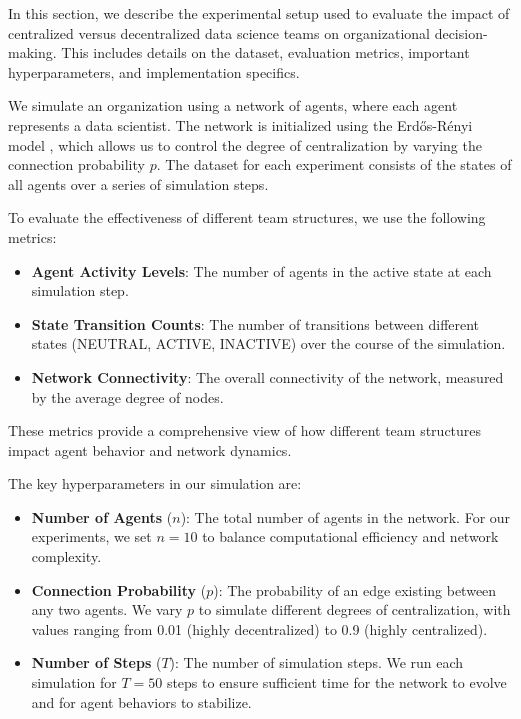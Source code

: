 \documentclass{article} %
\begin{document}
In this section, we describe the experimental setup used to evaluate the impact of centralized versus decentralized data science teams on organizational decision-making. This includes details on the dataset, evaluation metrics, important hyperparameters, and implementation specifics.

We simulate an organization using a network of agents, where each agent represents a data scientist. The network is initialized using the Erdős-Rényi model \citep{erdos1960evolution}, which allows us to control the degree of centralization by varying the connection probability \( p \). The dataset for each experiment consists of the states of all agents over a series of simulation steps.

To evaluate the effectiveness of different team structures, we use the following metrics:
\begin{itemize}
    \item \textbf{Agent Activity Levels}: The number of agents in the active state at each simulation step.
    \item \textbf{State Transition Counts}: The number of transitions between different states (NEUTRAL, ACTIVE, INACTIVE) over the course of the simulation.
    \item \textbf{Network Connectivity}: The overall connectivity of the network, measured by the average degree of nodes.
\end{itemize}
These metrics provide a comprehensive view of how different team structures impact agent behavior and network dynamics.

The key hyperparameters in our simulation are:
\begin{itemize}
    \item \textbf{Number of Agents} (\( n \)): The total number of agents in the network. For our experiments, we set \( n = 10 \) to balance computational efficiency and network complexity.
    \item \textbf{Connection Probability} (\( p \)): The probability of an edge existing between any two agents. We vary \( p \) to simulate different degrees of centralization, with values ranging from 0.01 (highly decentralized) to 0.9 (highly centralized).
    \item \textbf{Number of Steps} (\( T \)): The number of simulation steps. We run each simulation for \( T = 50 \) steps to ensure sufficient time for the network to evolve and for agent behaviors to stabilize.
\end{itemize}
\end{document}
